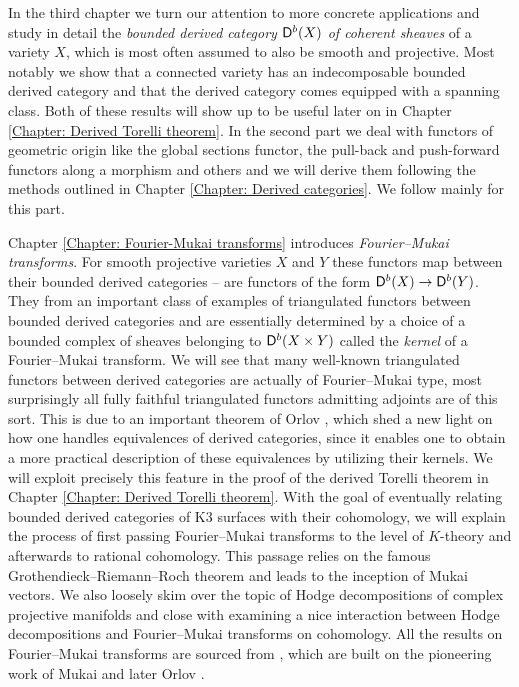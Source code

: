 In the third chapter we turn our attention to more concrete applications and study in detail the \emph{bounded derived category $\mathsf{D}^b(X)$ of coherent sheaves} of a variety $X$, which is most often assumed to also be smooth and projective. Most notably we show that a connected variety has an indecomposable bounded derived category and that the derived category comes equipped with a spanning class. Both of these results will show up to be useful later on in Chapter \ref{Chapter: Derived Torelli theorem}. In the second part we deal with functors of geometric origin like the global sections functor, the pull-back and push-forward functors along a morphism and others and we will derive them following the methods outlined in Chapter \ref{Chapter: Derived categories}. We follow mainly \cite[\S 3]{huybrechts2006fouriermukai} for this part.

Chapter \ref{Chapter: Fourier-Mukai transforms} introduces \emph{Fourier--Mukai transforms}. For smooth projective varieties $X$ and $Y$ these functors map between their bounded derived categories -- are functors of the form $\mathsf{D}^b(X) \to \mathsf{D}^b(Y)$. They from an important class of examples of triangulated functors between bounded derived categories and are essentially determined by a choice of a bounded complex of sheaves belonging to $\mathsf{D}^b(X \times Y)$ called the \emph{kernel} of a Fourier--Mukai transform. We will see that many well-known triangulated functors between  derived categories 
are actually of Fourier--Mukai type, most surprisingly all fully faithful triangulated functors admitting adjoints are of this sort. This is due to an important theorem of Orlov \cite{Orlov2003}, which shed a new light on how one handles equivalences of derived categories, since it enables one to obtain a more practical description of these equivalences by utilizing their kernels. We will exploit precisely this feature in the proof of the derived Torelli theorem in Chapter \ref{Chapter: Derived Torelli theorem}. With the goal of eventually relating bounded derived categories of K3 surfaces with their cohomology, we will explain the process of first passing Fourier--Mukai transforms to the level of $K$-theory and afterwards to rational cohomology. This passage relies on the famous Grothendieck--Riemann--Roch theorem and leads to the inception of Mukai vectors. 
We also loosely skim over the topic of Hodge decompositions of complex projective manifolds and close with examining a nice interaction between Hodge decompositions and Fourier--Mukai transforms on cohomology. All the results on Fourier--Mukai transforms are sourced from \cite[\S 5]{huybrechts2006fouriermukai}, which are built on the pioneering work of Mukai \cite{Mukai1981} and later Orlov \cite{Orlov2003}.

